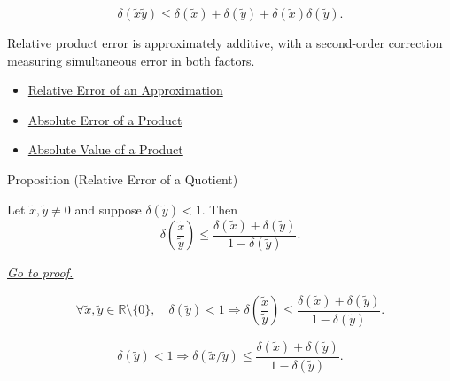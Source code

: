 \begin{remark*}
\[
\delta(\widetilde{x}\widetilde{y})\leq \delta(\widetilde{x})+\delta(\widetilde{y})+\delta(\widetilde{x})\delta(\widetilde{y}).
\]
\end{remark*}

\begin{remark*}[Interpretation]
Relative product error is approximately additive, with a second-order correction measuring simultaneous error in both factors.
\end{remark*}

\begin{dependencies}
\begin{itemize}
  \item \hyperref[def:relative-error-approximation]{Relative Error of an Approximation}
  \item \hyperref[thm:absolute-error-product]{Absolute Error of a Product}
  \item \hyperref[thm:absolute-value-product]{Absolute Value of a Product}
\end{itemize}
\end{dependencies}

\begin{propositionbox}{Proposition (Relative Error of a Quotient)}
\begin{proposition}
\label{prop:relative-error-quotient}
Let $\widetilde{x},\widetilde{y}\neq 0$ and suppose
$\delta(\widetilde{y})<1$. Then
\[
  \delta\!\left(\frac{\widetilde{x}}{\widetilde{y}}\right)
  \leq
  \frac{\delta(\widetilde{x})+\delta(\widetilde{y})}
       {1-\delta(\widetilde{y})}.
\]

\smallskip\noindent
\hyperref[prf:relative-error-quotient]{\textit{Go to proof.}}
\end{proposition}
\end{propositionbox}

\begin{remark*}
\[
\forall \widetilde{x},\widetilde{y}\in\mathbb{R}\setminus\{0\},\quad
\delta(\widetilde{y})<1
\Rightarrow
\delta\!\left(\frac{\widetilde{x}}{\widetilde{y}}\right)
\leq
\frac{\delta(\widetilde{x})+\delta(\widetilde{y})}{1-\delta(\widetilde{y})}.
\]
\end{remark*}

\begin{remark*}
\[
\delta(\widetilde{y})<1\Rightarrow \delta(\widetilde{x}/\widetilde{y})\leq \frac{\delta(\widetilde{x})+\delta(\widetilde{y})}{1-\delta(\widetilde{y})}.
\]
\end{remark*}

